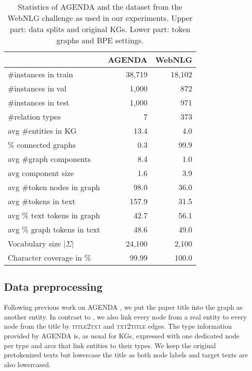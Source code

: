 \documentclass[11pt]{article}
\newcommand{\abs}[1]{\left|#1\right|}
\begin{document}
\begin{table}[t!]
	\centering
	\small
	\begin{tabular}{lrr}
		\toprule
		& {AGENDA} & {WebNLG} \\
		\midrule
		\#{}instances in train  & 38,719 & 18,102 \\
		\#{}instances in val & 1,000 & 872 \\
		\#{}instances in test & 1,000 & 971 \\
		\midrule
		\#{}relation types & 7 & 373 \\
		avg \#{}entities in KG & 13.4 & 4.0 \\
		\%{} connected graphs & 0.3 & 99.9 \\
		avg \#{}graph components & 8.4 & 1.0 \\
		avg component size & 1.6 & 3.9 \\
\midrule
		avg \#{}token nodes in graph & 98.0 & 36.0 \\
		avg \#{}tokens in text & 157.9 & 31.5 \\
		avg \%{} text tokens in graph & 42.7 & 56.1 \\
		avg \%{} graph tokens in text  & 48.6 & 49.0 \\
		\midrule
		Vocabulary size $\abs{\Sigma}$ & 24,100 & 2,100 \\
		Character coverage in \%{} & 99.99 & 100.0 \\ 
		\bottomrule
	\end{tabular}
	\caption{Statistics of AGENDA and the dataset from the WebNLG challenge as used in our experiments.
		Upper part: data splits and original KGs. Lower part: token graphs and BPE settings.}
	\label{tab:datastats}
\end{table}

\subsection{Data preprocessing}
\label{sec:preprocessing}

Following previous work on AGENDA \citep{ribeiro20},
we put the paper title into the graph as another entity.
In contrast to \citet{ribeiro20},
we also link every node from a real entity
to every node from the title by \textsc{title2txt} and \textsc{txt2title} edges.
The type information provided by {AGENDA} is,
as usual for KGs,
expressed with one dedicated node per type
and \hasType{} arcs that link entities to their types.
We keep the original pretokenized texts but lowercase the title
as both node labels and target texts are
also lowercased.
\end{document}
